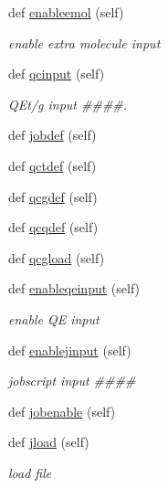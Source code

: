 \begin{DoxyCompactItemize}
def \hyperlink{classmolSimplify_1_1Classes_1_1mGUI_1_1mGUI_aa5f38a9ae05c47f75be5b14418c8b7d8}{enableemol} (self)
\begin{DoxyCompactList}\small\item\em enable extra molecule input \end{DoxyCompactList}\item 
def \hyperlink{classmolSimplify_1_1Classes_1_1mGUI_1_1mGUI_aeed319690a6ad8f1c409d68f75d40fc3}{qcinput} (self)
\begin{DoxyCompactList}\small\item\em Q\+Et/g input \#\#\#\#. \end{DoxyCompactList}\item 
def \hyperlink{classmolSimplify_1_1Classes_1_1mGUI_1_1mGUI_a66c039b5e79c697b2e316e89d5b3b00d}{jobdef} (self)
\item 
def \hyperlink{classmolSimplify_1_1Classes_1_1mGUI_1_1mGUI_a630fc75455e102360139845dc370ab56}{qctdef} (self)
\item 
def \hyperlink{classmolSimplify_1_1Classes_1_1mGUI_1_1mGUI_ac1e85c0c68b499b04b08a0a810faeaf3}{qcgdef} (self)
\item 
def \hyperlink{classmolSimplify_1_1Classes_1_1mGUI_1_1mGUI_a268a26ba8eb3bbeb5397ad2e72a37c91}{qcqdef} (self)
\item 
def \hyperlink{classmolSimplify_1_1Classes_1_1mGUI_1_1mGUI_aeb3c3bc73cec38034df419684cf15474}{qcgload} (self)
\item 
def \hyperlink{classmolSimplify_1_1Classes_1_1mGUI_1_1mGUI_a3b106365c361ee9960a75781e39fb837}{enableqeinput} (self)
\begin{DoxyCompactList}\small\item\em enable QE input \end{DoxyCompactList}\item 
def \hyperlink{classmolSimplify_1_1Classes_1_1mGUI_1_1mGUI_ac43b44c9e174db262fc55993c283fcdc}{enablejinput} (self)
\begin{DoxyCompactList}\small\item\em jobscript input \#\#\#\# \end{DoxyCompactList}\item 
def \hyperlink{classmolSimplify_1_1Classes_1_1mGUI_1_1mGUI_a6ee4faa64a7e22ecce5d6af564f40bb4}{jobenable} (self)
\item 
def \hyperlink{classmolSimplify_1_1Classes_1_1mGUI_1_1mGUI_af41532c156d42f8a818e78bc5269f763}{jload} (self)
\begin{DoxyCompactList}\small\item\em load file \end{DoxyCompactList}\item 

\end{DoxyCompactItemize}
